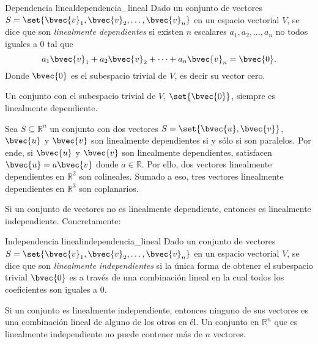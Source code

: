 \documentclass{fmbnotes}
\begin{document}
\begin{definicion}{Dependencia lineal}{dependencia_lineal}
Dado un conjunto de vectores \(S=\set{\bvec{v}_1,\bvec{v}_2,\ldots,\bvec{v}_n}\) en un espacio vectorial \(V\), se dice que son \emph{linealmente dependientes} si existen \(n\) escalares \(a_1,a_2,\ldots,a_n\) no todos iguales a 0 tal que
\[a_1\bvec{v}_1+a_2\bvec{v}_2+\cdots+a_n\bvec{v}_n=\bvec{0}.\]
Donde \(\bvec{0}\) es el subespacio trivial de \(V\), es decir su vector cero. 
\end{definicion}
Un conjunto con el subespacio trivial de \(V\), \(\set{\bvec{0}}\), siempre es linealmente dependiente.

Sea \(S \subseteq \mathbb{R}^{n}\) un conjunto con dos vectores \(S=\set{\bvec{u},\bvec{v}}\), \( \bvec{u} \) y \( \bvec{v} \) son linealmente dependientes si y sólo si son paralelos. Por ende, si \( \bvec{u} \) y \( \bvec{v} \) son linealmente dependientes, satisfacen \(\bvec{u}=a\bvec{v}\) donde \( a\in\mathbb{R} \). Por ello, dos vectores linealmente dependientes en \( \mathbb{R}^{2} \) son colineales. Sumado a eso, tres vectores linealmente dependientes en \( \mathbb{R}^{3} \) son coplanarios.

Si un conjunto de vectores no es linealmente dependiente, entonces es linealmente independiente. Concretamente:
\begin{definicion}{Independencia lineal}{independencia_lineal}
Dado un conjunto de vectores \(S=\set{\bvec{v}_1,\bvec{v}_2,\ldots,\bvec{v}_n}\) en un espacio vectorial \(V\), se dice que son \emph{linealmente independientes} si la única forma de obtener el subespacio trivial \( \bvec{0} \) es a través de una combinación lineal en la cual todos los coeficientes son iguales a 0.
\end{definicion}
Si un conjunto es linealmente independiente, entonces ninguno de sus vectores es una combinación lineal de alguno de los otros en él. Un conjunto en \( \mathbb{R}^{n} \) que es linealmente independiente no puede contener más de \( n \) vectores. 
\end{document}
